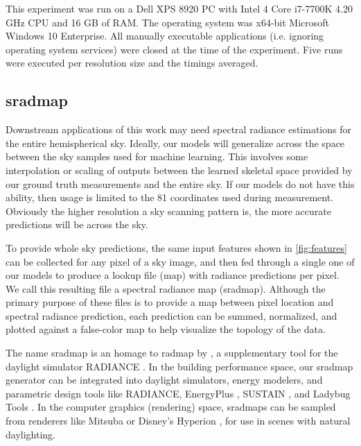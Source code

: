 This experiment was run on a Dell XPS 8920 PC with Intel 4 Core i7-7700K 4.20 GHz CPU and 16 GB of RAM. The operating system was x64-bit Microsoft Windows 10 Enterprise. All manually executable applications (i.e. ignoring operating system services) were closed at the time of the experiment. Five runs were executed per resolution size and the timings averaged.

\subsection{sradmap}
\label{ssec:sradmap}

Downstream applications of this work may need spectral radiance estimations for the entire hemispherical sky. Ideally, our models will generalize across the space between the sky samples used for machine learning. This involves some interpolation or scaling of outputs between the learned skeletal space provided by our ground truth measurements and the entire sky. If our models do not have this ability, then usage is limited to the 81 coordinates used during measurement. Obviously the higher resolution a sky scanning pattern is, the more accurate predictions will be across the sky.

To provide whole sky predictions, the same input features shown in \autoref{fig:features} can be collected for any pixel of a sky image, and then fed through a single one of our models to produce a lookup file (map) with radiance predictions per pixel. We call this resulting file a spectral radiance map (sradmap). Although the primary purpose of these files is to provide a map between pixel location and spectral radiance prediction, each prediction can be summed, normalized, and plotted against a false-color map to help visualize the topology of the data.

The name sradmap is an homage to radmap by \citet{anselmo_radmap}, a supplementary tool for the daylight simulator RADIANCE \citep{ward_radiance}. In the building performance space, our sradmap generator can be integrated into daylight simulators, energy modelers, and parametric design tools like RADIANCE, EnergyPlus \citep{crawley_energyplus}, SUSTAIN \citep{greenberg_sustain}, and Ladybug Tools \citep{roudsari_ladybug}. In the computer graphics (rendering) space, sradmaps can be sampled from renderers like Mitsuba \citep{jakob_mitsuba} or Disney's Hyperion \citep{burley_hyperion}, for use in scenes with natural daylighting.

